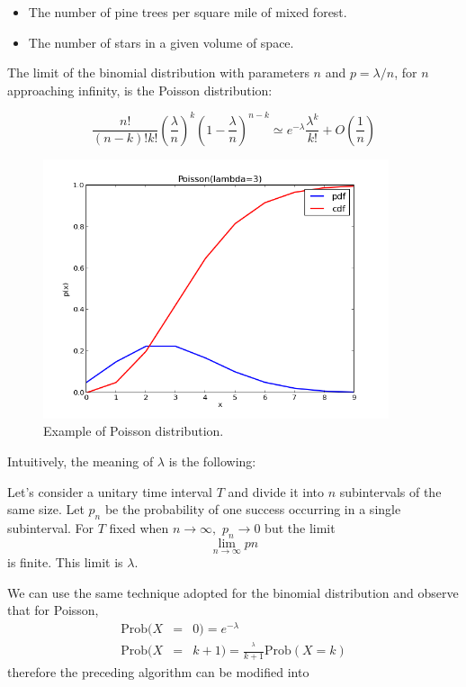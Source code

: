 \documentclass[justified,sixbynine]{tufte-book}
\theoremstyle{plain}%
\theoremstyle{definition}
\theoremstyle{remark}
\begin{document}
\begin{fullwidth}
\begin{itemize}
\item  The number of pine trees per square mile of mixed forest.

\item  The number of stars in a given volume of space.
\end{itemize}

The limit of the binomial distribution with parameters $n$ and $p=\lambda /n$, for $n$ approaching infinity, is the Poisson distribution:

\begin{equation}
\frac{n!}{(n-k)!k!}\left( \frac \lambda n\right) ^k\left( 1-\frac \lambda
n\right) ^{n-k}\simeq e^{-\lambda }\frac{\lambda ^k}{k!}+O(\frac 1n)
\end{equation}

\begin{figure}[ht]
\centering\includegraphics[width=4in]{images/poisson.png}
\caption{Example of Poisson distribution.}
\end{figure}

Intuitively, the meaning of $\lambda $ is the following:

Let's consider a unitary time interval $T$ and divide it into
$n$ subintervals of the same size.
Let $p_n$ be the probability of one success occurring in a single
subinterval. For $T$ fixed when $n\rightarrow \infty ,$ $p_n\rightarrow 0$
but the limit
\begin{equation}
\lim_{n\rightarrow \infty }pn
\end{equation}
is finite. This limit is $\lambda $.

We can use the same technique adopted for the
binomial distribution and observe that for Poisson,
\begin{eqnarray}
\textrm{Prob}(X &=&0)=e^{-\lambda } \\
\textrm{Prob}(X &=&k+1)=\frac{^\lambda }{k+1}\textrm{Prob}(X=k)
\end{eqnarray}
therefore the preceding algorithm can be modified into


\end{fullwidth}
\end{document}
